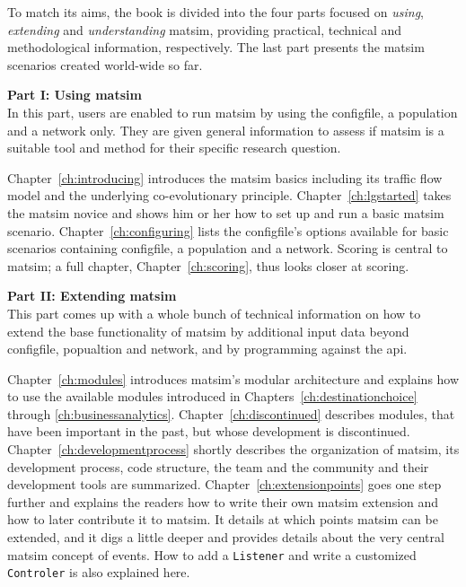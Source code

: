 To match its aims, the book is divided into the four parts focused on \emph{using}, \emph{extending} and \emph{understanding} \gls{matsim}, providing practical, technical and methodological information, respectively. The last part presents the \gls{matsim} scenarios created world-wide so far. %

\textbf{Part I: Using \acrshort{matsim}} \\
In this part, users are enabled to run \gls{matsim} by using the \gls{configfile}, a population and a network only. They are given general information to assess if \gls{matsim} is a suitable tool and method for their specific research question.

Chapter~\ref{ch:introducing} introduces the \gls{matsim} basics including its traffic flow model and the underlying co-evolutionary principle. 
Chapter~\ref{ch:lgstarted} takes the \gls{matsim} novice and shows him or her how to set up and run a basic \gls{matsim} \gls{scenario}. 
Chapter~\ref{ch:configuring} lists the \gls{configfile}'s options available for basic scenarios containing \gls{configfile}, a population and a network.  
Scoring is central to \gls{matsim}; a full chapter, Chapter~\ref{ch:scoring}, thus looks closer at scoring. 

\textbf{Part II: Extending \acrshort{matsim}} \\
This part comes up with a whole bunch of technical information on how to extend the base functionality of \gls{matsim} by additional input data beyond \gls{configfile}, popualtion and network, and by programming against the \gls{api}. 

Chapter~\ref{ch:modules} introduces \gls{matsim}'s modular architecture and explains how to use the available \glspl{module} introduced in Chapters~\ref{ch:destinationchoice} through \ref{ch:businessanalytics}. Chapter~\ref{ch:discontinued} describes modules, that have been important in the past, but whose development is discontinued.
Chapter~\ref{ch:developmentprocess} shortly describes the organization of \gls{matsim}, \ie its development process, code structure, the team and the community and their development tools are summarized. 
Chapter~\ref{ch:extensionpoints} goes one step further and explains the readers how to write their own \gls{matsim} \gls{extension} and how to later contribute it to \gls{matsim}. It details at which points \gls{matsim} can be extended, and it digs a little deeper and provides details about the very central \gls{matsim} concept of \glspl{event}. How to add a \lstinline|Listener| and write a customized \lstinline|Controler| is also explained here.

